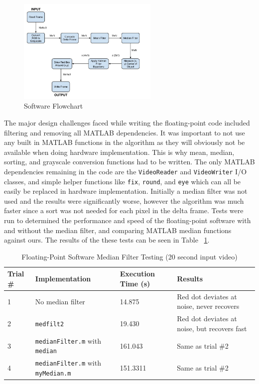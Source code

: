 \documentclass[11pt]{article} %
\begin{document}
\begin{figure}[h]
\centering
\includegraphics[width=0.6\textwidth]{./images/software_flow.jpg}
\caption{Software Flowchart}
\label{fig:sw_flow}    
\end{figure}
\FloatBarrier
\noindent
The major design challenges faced while writing the floating-point code included filtering and removing all MATLAB dependencies. It was important to not use any built in MATLAB functions in the algorithm as they will obviously not be available when doing hardware implementation. This is why mean, median, sorting, and grayscale conversion functions had to be written. The only MATLAB dependencies remaining in the code are the \texttt{VideoReader} and \texttt{VideoWriter} I/O classes, and simple helper functions like \texttt{fix}, \texttt{round}, and \texttt{eye} which can all be easily be replaced in hardware implementation. Initially a median filter was not used and the results were significantly worse, however the algorithm was much faster since a sort was not needed for each pixel in the delta frame. Tests were run to determined the performance and speed of the floating-point software with and without the median filter, and comparing MATLAB median functions against ours. The results of the these tests can be seen in Table ~\ref{table:x}. 
\begin{table}[h]
\caption{Floating-Point Software Median Filter Testing (20 second input video)}
\label{table:x}
 \begin{tabular}{ | l | p{4cm} | l | p{5cm} |} \hline
Trial \# & Implementation & Execution Time (s) & Results \\ \hline
1 & No median filter & 14.875 & Red dot deviates at noise, never recovers  \\ \hline
2 & \texttt{medfilt2} & 19.430 & Red dot deviates at noise, but recovers fast \\ \hline
3 & \texttt{medianFilter.m} with \texttt{median} & 161.043 & Same as trial \#2 \\ \hline
4 & \texttt{medianFilter.m} with \texttt{myMedian.m} & 151.3311 & Same as trial \#2 \\ \hline
\end{tabular}
\end{table}
\end{document}
